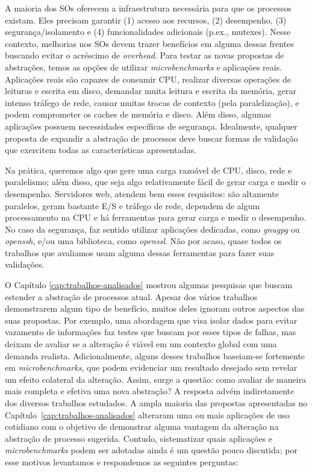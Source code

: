 \label{cap:validacoes}

A maioria dos SOs oferecem a infraestrutura necessária para que os processos
existam. Eles precisam garantir (1) acesso aos recursos, (2) desempenho, (3)
segurança/isolamento e (4) funcionalidades adicionais (p.ex., mutexes).  Nesse
contexto, melhorias nos SOs devem trazer benefícios em alguma dessas frentes
buscando evitar o acréscimo de \emph{overhead}. Para testar as novas propostas de
abstrações, temos as opções de utilizar \emph{microbenchmarks} e aplicações
reais.  Aplicações reais são capazes de consumir CPU, realizar diversas
operações de leituras e escrita em disco, demandar muita leitura e escrita da
memória, gerar intenso tráfego de rede, causar muitas trocas de contexto (pela
paralelização), e podem comprometer os caches de memória e disco. Além disso,
algumas aplicações possuem necessidades específicas de segurança. Idealmente,
qualquer proposta de expandir a abstração de processos deve buscar formas de
validação que exercitem todas as características apresentadas.

Na prática, queremos algo que gere uma carga razoável de CPU, disco, rede e
paralelismo; além disso, que seja algo relativamente fácil de gerar carga e
medir o desempenho. Servidores web, atendem bem esses requisitos: são altamente
paralelos, geram bastante E/S e tráfego de rede, dependem de algum
processamento na CPU e há ferramentas para gerar carga e medir o desempenho. No
caso da segurança, faz sentido utilizar aplicações dedicadas, como
\emph{gnugpg} ou \emph{openssh}, e/ou uma biblioteca, como \emph{openssl}. Não
por acaso, quase todos os trabalhos que avaliamos usam alguma dessas
ferramentas para fazer suas validações.

O Capítulo \ref{cap:trabalhos-analisados} mostrou algumas pesquisas que buscam
estender a abstração de processos atual. Apesar dos vários trabalhos
demonstrarem algum tipo de benefício, muitos deles ignoram outros aspectos das
suas propostas. Por exemplo, uma abordagem que visa isolar dados para evitar
vazamento de informações faz testes que buscam por esses tipos de falhas, mas
deixam de avaliar se a alteração é viável em um contexto global com uma
demanda realista. Adicionalmente, alguns desses trabalhos baseiam-se
fortemente em \emph{microbenchmarks}, que podem evidenciar um resultado
desejado sem revelar um efeito colateral da alteração. Assim, surge a questão:
como avaliar de maneira mais completa e efetiva uma nova abstração? A resposta
advém indiretamente dos diversos trabalhos estudados. A ampla maioria das
propostas apresentadas no Capítulo~\ref{cap:trabalhos-analisados} alteraram uma
ou mais aplicações de uso cotidiano com o objetivo de demonstrar alguma
vantagem da alteração na abstração de processo sugerida. Contudo, sistematizar
quais aplicações e \emph{microbenchmarks} podem ser adotadas ainda é um questão
pouco discutida; por esse motivos levantamos e respondemos as seguintes
perguntas:

